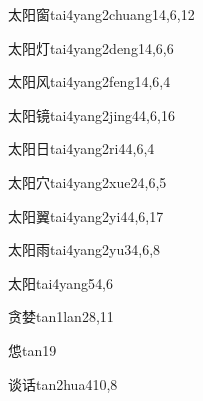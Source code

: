 \begin{verbete}{太阳窗}{tai4yang2chuang1}{4,6,12}
\end{verbete}

\begin{verbete}{太阳灯}{tai4yang2deng1}{4,6,6}
\end{verbete}

\begin{verbete}{太阳风}{tai4yang2feng1}{4,6,4}
\end{verbete}

\begin{verbete}{太阳镜}{tai4yang2jing4}{4,6,16}
\end{verbete}

\begin{verbete}{太阳日}{tai4yang2ri4}{4,6,4}
\end{verbete}

\begin{verbete}{太阳穴}{tai4yang2xue2}{4,6,5}
\end{verbete}

\begin{verbete}{太阳翼}{tai4yang2yi4}{4,6,17}
\end{verbete}

\begin{verbete}{太阳雨}{tai4yang2yu3}{4,6,8}
\end{verbete}

\begin{verbete}{太阳}{tai4yang5}{4,6}
\end{verbete}

\begin{verbete}{贪婪}{tan1lan2}{8,11}
\end{verbete}

\begin{verbete}{怹}{tan1}{9}
\end{verbete}

\begin{verbete}{谈话}{tan2hua4}{10,8}
\end{verbete}

